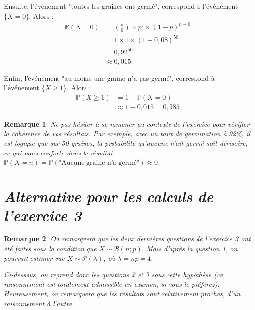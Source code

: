 \documentclass[a4paper,oneside,12pt]{article}
\theoremstyle{plain}
\newtheorem*{remark}{Remarque}
\def\P{{\mathbb P}}
\begin{document}
\begin{enumerate}
   
   Ensuite, l'événement "toutes les graines ont germé", correspond à l'événement $\{X = 0\}$. Alors :
   \begin{align*}
       \P(X = 0) &= \binom{n}{0}\times p^0\times (1-p)^{n-0}\\
       &= 1\times 1 \times (1-0,08)^{50}\\
       &= 0,92^{50} \\
       &\approx 0,015
   \end{align*}
   
   Enfin, l'événement "au moins une graine n'a pas germé", correspond à l'événement $\{X \ge 1\}$. Alors :
   \begin{align*}
       \P(X \ge 1) &= 1 - \P(X =0) \\
       &\approx 1- 0,015 = 0,985
   \end{align*}
   
   \begin{remark}
   Ne pas hésiter à se ramener au contexte de l'exercice pour vérifier la cohérence de vos résultats. Par exemple, avec un taux de germination à 92\%, il est logique que sur 50 graines, la probabilité qu'aucune n'ait germé soit dérisoire, ce qui nous conforte dans le résultat $\P(X=n) = \P(\mbox{"Aucune graine n'a germé"}) \approx0$.
   \end{remark}
\end{enumerate}
\newpage

\section*{\textit{Alternative pour les calculs de l'exercice 3}}
\begin{remark}
On remarquera que les deux dernières questions de l'exercice 3 ont été faites sous la condition que $X \sim \mathcal{B}(n; p)$. Mais d'après la question 1, on pourrait estimer que $X \sim \mathcal{P}(\lambda)$, où $\lambda = np = 4$. 

Ci-dessous, on reprend donc les questions 2 et 3 sous cette hypothèse (ce raisonnement est totalement admissible en examen, si vous le préférez). Heureusement, on remarquera que les résultats sont relativement proches, d'un raisonnement à l'autre.
\end{remark}
\end{document}
